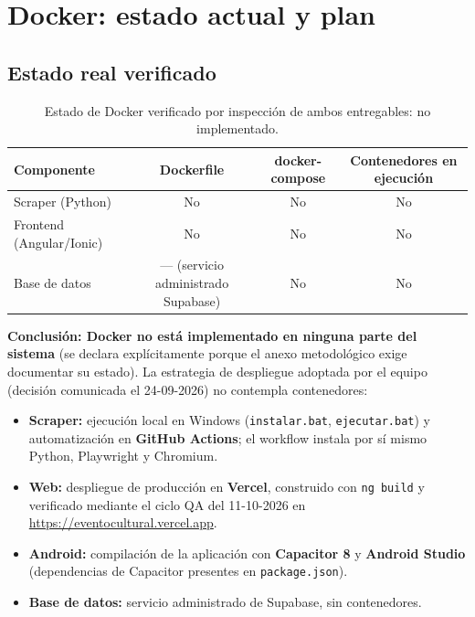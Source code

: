 \section{Docker: estado actual y plan}
\label{sec:docker}

\subsection{Estado real verificado}

\begin{table}[ht]
\centering\small
\renewcommand{\arraystretch}{1.2}
\begin{tabular}{l c c c}
\toprule
\textbf{Componente} & \textbf{Dockerfile} & \textbf{docker-compose} & \textbf{Contenedores en ejecución} \\
\midrule
Scraper (Python) & No & No & No \\
Frontend (Angular/Ionic) & No & No & No \\
Base de datos & --- (servicio administrado Supabase) & No & No \\
\bottomrule
\end{tabular}
\caption{Estado de Docker verificado por inspección de ambos entregables: no implementado.}
\label{tab:docker}
\end{table}

\textbf{Conclusión: Docker no está implementado en ninguna parte del sistema} (se declara
explícitamente porque el anexo metodológico exige documentar su estado). La estrategia de
despliegue adoptada por el equipo (decisión comunicada el 24-09-2026) no contempla
contenedores:

\begin{itemize}[leftmargin=1.4em]
    \item \textbf{Scraper:} ejecución local en Windows (\texttt{instalar.bat},
    \texttt{ejecutar.bat}) y automatización en \textbf{GitHub Actions}; el workflow instala
    por sí mismo Python, Playwright y Chromium.
    \item \textbf{Web:} despliegue de producción en \textbf{Vercel}, construido con
    \texttt{ng build} y verificado mediante el ciclo QA del 11-10-2026 en
    \url{https://eventocultural.vercel.app}.
    \item \textbf{Android:} compilación de la aplicación con \textbf{Capacitor 8} y
    \textbf{Android Studio} (dependencias de Capacitor presentes en \texttt{package.json}).
    \item \textbf{Base de datos:} servicio administrado de Supabase, sin contenedores.
\end{itemize}

